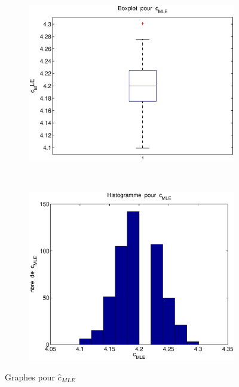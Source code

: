 \begin{figure}[!ht]
        \centering
        \begin{subfigure}[b]{0.5\textwidth}
                \includegraphics[width=\textwidth]{graphes/boxplot_cmle.eps}
        \end{subfigure}%
        ~
        \begin{subfigure}[b]{0.5\textwidth}
                \includegraphics[width=\textwidth]{graphes/hist_cmle.eps}
        \end{subfigure}
        \caption{Graphes pour $\hat{c}_{MLE}$}\label{fig:cmle}
\end{figure}

